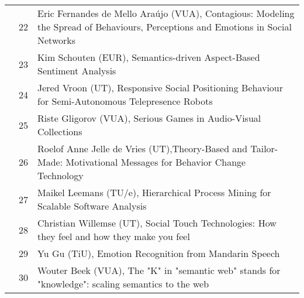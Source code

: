 \begin{xltabular}{\linewidth}{@{} l @{\hspace{0.5em}} l @{\hspace{1em}} X @{}}
	&	 22	&	 Eric Fernandes de Mello Ara\'{u}jo (VUA), Contagious: Modeling the Spread of Behaviours, Perceptions and Emotions in Social Networks \\
	&	 23	&	 Kim Schouten (EUR), Semantics-driven Aspect-Based Sentiment Analysis \\
	&	 24	&	 Jered Vroon (UT), Responsive Social Positioning Behaviour for Semi-Autonomous Telepresence Robots \\
	&	 25	&	 Riste Gligorov (VUA), Serious Games in Audio-Visual Collections \\
	&	 26	& 	 Roelof Anne Jelle de Vries (UT),Theory-Based and Tailor-Made: Motivational Messages for Behavior Change Technology \\
	&	 27	&	 Maikel Leemans (TU/e), Hierarchical Process Mining for Scalable Software Analysis \\
	&	 28	&	 Christian Willemse (UT), Social Touch Technologies: How they feel and how they make you feel \\
	&	 29	&	 Yu Gu (TiU), Emotion Recognition from Mandarin Speech \\
	&	 30	&	 Wouter Beek (VUA),  The "K" in "semantic web" stands for "knowledge": scaling semantics to the web \\
	

\end{xltabular}
